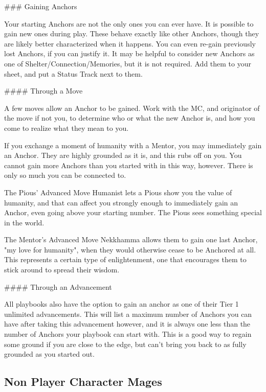 \documentclass[
  oneside,
  statementpaper,
  9pt]{memoir}
\begin{document}
\begin{Player}
### Gaining Anchors

Your starting Anchors are not the only ones you can ever have. It is possible to gain new ones during play. These behave exactly like other Anchors, though they are likely better characterized when it happens. You can even re-gain previously lost Anchors, if you can justify it. It may be helpful to consider new Anchors as one of Shelter/Connection/Memories, but it is not required. Add them to your sheet, and put a Status Track next to them.

#### Through a Move

A few moves allow an Anchor to be gained. Work with the MC, and originator of the move if not you, to determine who or what the new Anchor is, and how you come to realize what they mean to you.

If you exchange a moment of humanity with a Mentor, you may immediately gain an Anchor. They are highly grounded as it is, and this rubs off on you. You cannot gain more Anchors than you started with in this way, however. There is only so much you can be connected to.

The Pious’ Advanced Move Humanist lets a Pious show you the value of humanity, and that can affect you strongly enough to immediately gain an Anchor, even going above your starting number. The Pious sees something special in the world.

The Mentor’s Advanced Move Nekkhamma allows them to gain one last Anchor, "my love for humanity", when they would otherwise cease to be Anchored at all. This represents a certain type of enlightenment, one that encourages them to stick around to spread their wisdom.

#### Through an Advancement

All playbooks also have the option to gain an anchor as one of their Tier 1 unlimited advancements. This will list a maximum number of Anchors you can have after taking this advancement however, and it is always one less than the number of Anchors your playbook can start with. This is a good way to regain some ground if you are close to the edge, but can’t bring you back to as fully grounded as you started out.

\end{Player}

\hypertarget{non-player-character-mages}{%
\subsection{Non Player Character
Mages}\label{non-player-character-mages}}
\end{document}
